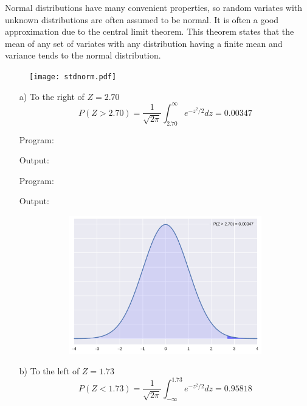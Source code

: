 \documentclass[a4paper,10pt,openright]{report}
\begin{document}
\begin{enumerate}
Normal distributions have many convenient properties, so random variates with unknown
distributions are often assumed to be normal. It is often a good approximation due to the
central limit theorem. This theorem states that the mean of any set of variates with any 
distribution having a finite mean and variance tends to the normal distribution. \\

\begin{figure}[ht!]
\texttt{[image: stdnorm.pdf]}
\centering
\end{figure}

\pagebreak

\begin{enumerate}

\item[a)] To the right of $Z = 2.70$
\begin{equation*}
P(Z > 2.70) = \frac{1}{\sqrt{2\pi}} \int_{2.70}^{\infty} e^{-z^{2}/2} dz = 0.00347
\end{equation*}

\vspace{1cm}

Program:

Output:


\vspace{1cm}

Program:

Output:


\begin{figure}[ht!]
\includegraphics[width=12cm,height=6cm,keepaspectratio]{norm1a.pdf}
\centering
\end{figure}

\item[b)] To the left of $Z = 1.73$
\begin{equation*}
P(Z < 1.73) = \frac{1}{\sqrt{2\pi}} \int_{-\infty}^{1.73} e^{-z^{2}/2} dz = 0.95818
\end{equation*}


\end{enumerate}
\end{enumerate}
\end{document}
